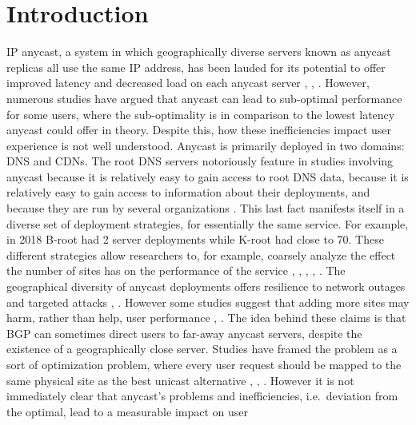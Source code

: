 \documentclass[sigconf,nonacm,10pt]{acmart}
\begin{document}
\section{Introduction}\label{introduction-1}

\label{sec:introduction} IP anycast, a system in which geographically
diverse servers known as anycast replicas all use the same IP address,
has been lauded for its potential to offer improved latency and
decreased load on each anycast server \cite{katabi2000framework},
\cite{metz2002ip}, \cite{rfc_1546}. However, numerous studies have
argued that anycast can lead to sub-optimal performance for some users,
where the sub-optimality is in comparison to the lowest latency anycast
could offer in theory. Despite this, how these inefficiencies impact
user experience is not well understood. \break \break
Anycast is primarily deployed in two domains: DNS and CDNs. The root DNS
servers notoriously feature in studies involving anycast because it is
relatively easy to gain access to root DNS data, because it is
relatively easy to gain access to information about their deployments,
and because they are run by several organizations \cite{root_servers}.
This last fact manifests itself in a diverse set of deployment
strategies, for essentially the same service. For example, in 2018
B-root had 2 server deployments while K-root had close to 70. These
different strategies allow researchers to, for example, coarsely analyze
the effect the number of sites has on the performance of the service
\cite{li_levin_spring_bhattacharjee_2018}, \cite{de2017anycast},
\cite{mcquistin2019taming}, \cite{colitti2006evaluating},
\cite{moura2016anycast}. \break \break
The geographical diversity of anycast deployments offers resilience to
network outages and targeted attacks
\cite{li_levin_spring_bhattacharjee_2018}, \cite{moura2016anycast}.
However some studies suggest that adding more sites may harm, rather
than help, user performance \cite{li_levin_spring_bhattacharjee_2018},
\cite{sarat2006use}. The idea behind these claims is that BGP can
sometimes direct users to far-away anycast servers, despite the
existence of a geographically close server. Studies have framed the
problem as a sort of optimization problem, where every user request
should be mapped to the same physical site as the best unicast
alternative \cite{mcquistin2019taming},
\cite{li_levin_spring_bhattacharjee_2018}, \cite{de2017anycast}. However
it is not immediately clear that anycast's problems and inefficiencies,
i.e.~deviation from the optimal, lead to a measurable impact on user
\end{document}
